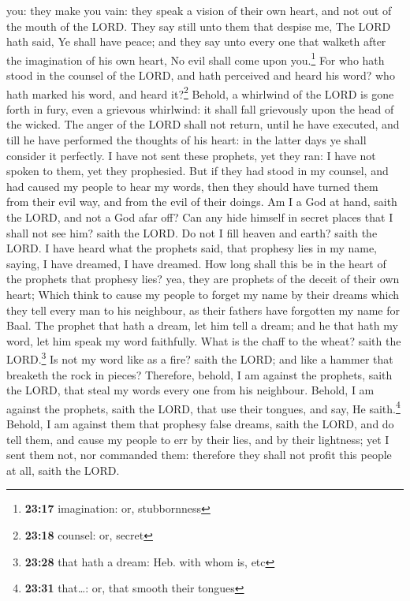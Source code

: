 you: they make you vain: they speak a vision of their own heart, and not
out of the mouth of the LORD.  They say still unto them
that despise me, The LORD hath said, Ye shall have peace; and they say
unto every one that walketh after the imagination of his own heart, No
evil shall come upon you.\footnote{\textbf{23:17} imagination: or,
  stubbornness}  For who hath stood in the counsel of the
LORD, and hath perceived and heard his word? who hath marked his word,
and heard it?\footnote{\textbf{23:18} counsel: or, secret}
 Behold, a whirlwind of the LORD is gone forth in fury,
even a grievous whirlwind: it shall fall grievously upon the head of the
wicked.  The anger of the LORD shall not return, until he
have executed, and till he have performed the thoughts of his heart: in
the latter days ye shall consider it perfectly.  I have
not sent these prophets, yet they ran: I have not spoken to them, yet
they prophesied.  But if they had stood in my counsel,
and had caused my people to hear my words, then they should have turned
them from their evil way, and from the evil of their doings.
 Am I a God at hand, saith the LORD, and not a God afar
off?  Can any hide himself in secret places that I shall
not see him? saith the LORD. Do not I fill heaven and earth? saith the
LORD.  I have heard what the prophets said, that prophesy
lies in my name, saying, I have dreamed, I have dreamed. 
How long shall this be in the heart of the prophets that prophesy lies?
yea, they are prophets of the deceit of their own heart; 
Which think to cause my people to forget my name by their dreams which
they tell every man to his neighbour, as their fathers have forgotten my
name for Baal.  The prophet that hath a dream, let him
tell a dream; and he that hath my word, let him speak my word
faithfully. What is the chaff to the wheat? saith the LORD.\footnote{\textbf{23:28}
  that hath a dream: Heb. with whom is, etc}  Is not my
word like as a fire? saith the LORD; and like a hammer that breaketh the
rock in pieces?  Therefore, behold, I am against the
prophets, saith the LORD, that steal my words every one from his
neighbour.  Behold, I am against the prophets, saith the
LORD, that use their tongues, and say, He saith.\footnote{\textbf{23:31}
  that\ldots: or, that smooth their tongues}  Behold, I
am against them that prophesy false dreams, saith the LORD, and do tell
them, and cause my people to err by their lies, and by their lightness;
yet I sent them not, nor commanded them: therefore they shall not profit
this people at all, saith the LORD.

